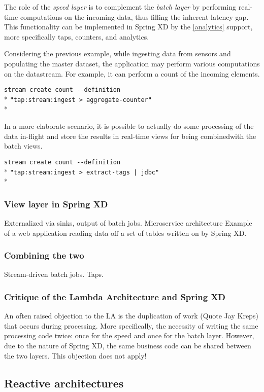 The role of the \emph{speed layer} is to complement the \emph{batch layer} 
by performing real-time computations on the incoming data, thus filling the 
inherent latency gap. This functionality can be implemented in Spring XD by the 
\ref{analytics} support, more specifically taps, counters, and analytics.

Considering the previous example, while ingesting data from sensors and 
populating the master dataset, the application may perform various computations 
on the datastream. For example, it can perform a count of the incoming elements. 

\verb;stream create count --definition  ;\\*
\verb;"tap:stream:ingest > aggregate-counter";\\*

In a more elaborate scenario, it is possible to actually do 
some processing of the data in-flight and store the results in real-time views
for being combinedwith the batch views.

\verb;stream create count --definition  ;\\*
\verb;"tap:stream:ingest > extract-tags | jdbc";\\*

\subsubsection {View layer in Spring XD}

Externalized via sinks, output of batch jobs. Microservice architecture
Example of a web application reading data off a set of tables
written on by Spring XD. 

\subsubsection {Combining the two}

Stream-driven batch jobs. Taps. 


\subsubsection {Critique of the Lambda Architecture and Spring XD}

An often raised objection to the LA is the duplication of work
(Quote Jay Kreps) that occurs during processing. More specifically,
the necessity of writing the same processing code twice: once for the
speed and once for the batch layer. However, due to the nature of
Spring XD, the same business code can be shared between the two 
layers. This objection does not apply!

\subsection {Reactive architectures}